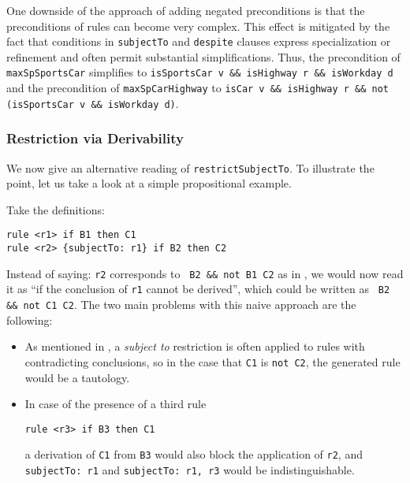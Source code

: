 One downside of the approach of adding negated preconditions is that the
preconditions of rules can become very complex. This effect is mitigated by
the fact that conditions in \texttt{subjectTo} and \texttt{despite} clauses
express specialization or refinement and often permit substantial
simplifications. Thus, the precondition of \texttt{maxSpSportsCar} simplifies
to \texttt{isSportsCar v \&\& isHighway r \&\& isWorkday d} and the
precondition of \texttt{maxSpCarHighway} to
\texttt{isCar v \&\& isHighway r \&\& not (isSportsCar v \&\& isWorkday d)}.


\subsubsection{Restriction via Derivability}\label{sec:restr_deriv}

We now give an alternative reading of \texttt{restrictSubjectTo}. To
illustrate the point, let us take a look at a simple propositional example.

\begin{example}\label{ex:small_propositional} Take the definitions:
\begin{lstlisting}
rule <r1> if B1 then C1
rule <r2> {subjectTo: r1} if B2 then C2
\end{lstlisting}
\end{example}

Instead of saying: \texttt{r2} corresponds to
\texttt{ B2 \&\& not B1  C2} 
as in , we would now read it as
``if the conclusion of \texttt{r1} cannot be derived'', 
which could be written as
\texttt{ B2 \&\& not C1  C2}.
The two main problems with this naive approach are the following:
\begin{itemize}
\item As mentioned in , a \emph{subject to}
  restriction is often applied to rules with contradicting conclusions, so in
  the case that \texttt{C1} is \texttt{not C2}, the generated rule would be a
  tautology.
\item In case of the presence of a third rule
\begin{lstlisting}[frame=none]
rule <r3> if B3 then C1
\end{lstlisting}
a derivation of \texttt{C1} from \texttt{B3} would also block the application
of \texttt{r2}, and \texttt{subjectTo: r1} and \texttt{subjectTo: r1, r3}
would be indistinguishable.
\end{itemize}


